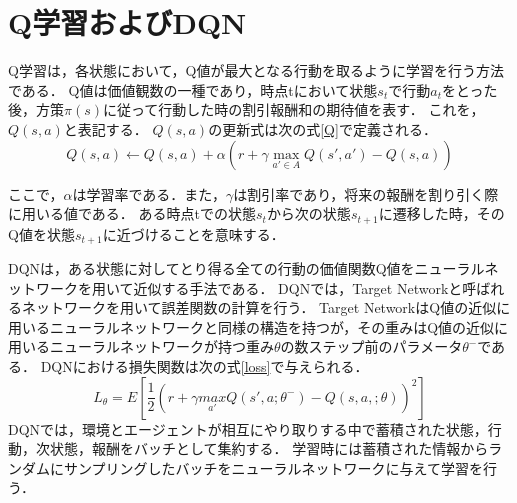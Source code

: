 \documentclass[12pt,oneside]{ise-thesis} %
\begin{document}
\section{Q学習およびDQN}
Q学習は，各状態において，Q値が最大となる行動を取るように学習を行う方法である．
Q値は価値観数の一種であり，時点tにおいて状態$s_t$で行動$a_t$をとった後，方策$\pi(s)$に従って行動した時の割引報酬和の期待値を表す．
これを，$Q(s,a)$と表記する．
$Q(s,a)$の更新式は次の式\ref{Q}で定義される．
\begin{equation}
\label{Q}
    Q(s,a) \leftarrow{}Q(s,a)+\alpha(r+\gamma \underset{a'\in A}{\max}Q(s',a')-Q(s,a))
\end{equation}

ここで，$\alpha$は学習率である．また，$\gamma$は割引率であり，将来の報酬を割り引く際に用いる値である．
ある時点tでの状態$s_t$から次の状態$s_{t+1}$に遷移した時，そのQ値を状態$s_{t+1}$に近づけることを意味する．

DQNは，ある状態に対してとり得る全ての行動の価値関数Q値をニューラルネットワークを用いて近似する手法である．
DQNでは，Target Networkと呼ばれるネットワークを用いて誤差関数の計算を行う．
Target NetworkはQ値の近似に用いるニューラルネットワークと同様の構造を持つが，その重みはQ値の近似に用いるニューラルネットワークが持つ重み$\theta$の数ステップ前のパラメータ$\theta^-$である．
DQNにおける損失関数は次の式\ref{loss}で与えられる．
\begin{equation}
\label{loss}
    L_{\theta} = E[\frac{1}{2}(r+\gamma \underset{a'}{max}Q(s',a;\theta^-) - Q(s,a,;\theta))^2]
\end{equation}
DQNでは，環境とエージェントが相互にやり取りする中で蓄積された状態，行動，次状態，報酬をバッチとして集約する．
学習時には蓄積された情報からランダムにサンプリングしたバッチをニューラルネットワークに与えて学習を行う．

\end{document}
